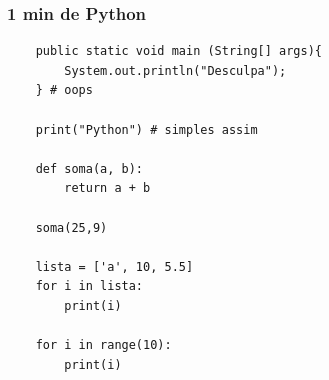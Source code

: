 \documentclass[aspectratio=169]{beamer}
\begin{document}
\begin{frame}[fragile]\frametitle{1 min de Python}

\begin{verbatim}
    public static void main (String[] args){
        System.out.println("Desculpa");
    } # oops

    print("Python") # simples assim

    def soma(a, b):
        return a + b

    soma(25,9)

    lista = ['a', 10, 5.5]
    for i in lista:
        print(i)

    for i in range(10):
        print(i)

\end{verbatim}

\end{frame}
\end{document}
